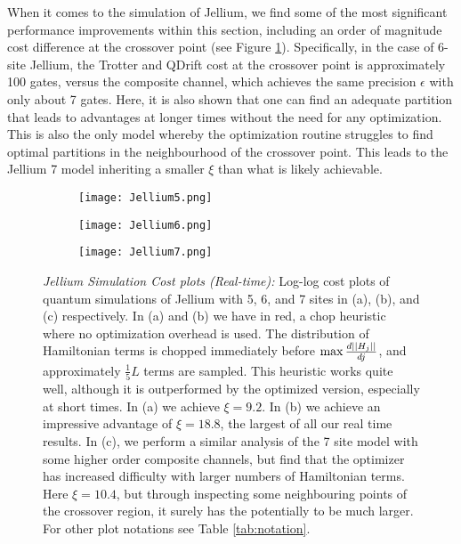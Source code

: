 When it comes to the simulation of Jellium, we find some of the most significant performance improvements within this section, including an order of magnitude cost difference at the crossover point (see Figure \ref{fig:Jellium56}). Specifically, in the case of 6-site Jellium, the Trotter and QDrift cost at the crossover point is approximately 100 gates, versus the composite channel, which achieves the same precision $\epsilon$ with only about 7 gates. Here, it is also shown that one can find an adequate partition that leads to advantages at longer times without the need for any optimization. This is also the only model whereby the optimization routine struggles to find optimal partitions in the neighbourhood of the crossover point. This leads to the Jellium 7 model inheriting a smaller $\xi$ than what is likely achievable. 
\begin{figure}[h!]
    \centering
        \begin{subfigure}[b]{.49\textwidth}
            \texttt{[image: Jellium5.png]}
            \caption{}
        \end{subfigure}
        \begin{subfigure}[b]{.49\textwidth}
            \texttt{[image: Jellium6.png]}
            \caption{}
        \end{subfigure}
        \begin{subfigure}[b]{.49\textwidth}
            \texttt{[image: Jellium7.png]}
            \caption{}
        \end{subfigure}
        \caption{\textit{Jellium Simulation Cost plots (Real-time): } Log-log cost plots of quantum simulations of Jellium with 5, 6, and 7 sites in (a), (b), and (c) respectively. In (a) and (b) we have in red, a chop heuristic where no optimization overhead is used. The distribution of Hamiltonian terms is chopped immediately before $\max \frac{d \left| \left| H_j \right| \right|}{dj}$, and approximately $\frac{1}{5}L$ terms are sampled. This heuristic works quite well, although it is outperformed by the optimized version, especially at short times. In (a) we achieve $\xi = 9.2$. In (b) we achieve an impressive advantage of $\xi =  18.8$, the largest of all our real time results. In (c), we perform a similar analysis of the 7 site model with some higher order composite channels, but find that the optimizer has increased difficulty with larger numbers of Hamiltonian terms. Here $\xi = 10.4$, but through inspecting some neighbouring points of the crossover region, it surely has the potentially to be much larger. For other plot notations see Table \ref{tab:notation}.} \label{fig:Jellium56}
\end{figure}
\FloatBarrier

